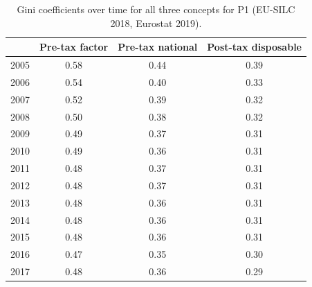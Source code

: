 \documentclass[a4paper]{article}\usepackage[]{graphicx}\usepackage[]{color}
\begin{document}
\begin{table}[ht]
\centering
\begin{tabular}{lccc}
  \toprule
 & Pre-tax factor & Pre-tax national & Post-tax disposable \\ 
  \midrule
2005 & 0.58 & 0.44 & 0.39 \\ 
  2006 & 0.54 & 0.40 & 0.33 \\ 
  2007 & 0.52 & 0.39 & 0.32 \\ 
  2008 & 0.50 & 0.38 & 0.32 \\ 
  2009 & 0.49 & 0.37 & 0.31 \\ 
  2010 & 0.49 & 0.36 & 0.31 \\ 
  2011 & 0.48 & 0.37 & 0.31 \\ 
  2012 & 0.48 & 0.37 & 0.31 \\ 
  2013 & 0.48 & 0.36 & 0.31 \\ 
  2014 & 0.48 & 0.36 & 0.31 \\ 
  2015 & 0.48 & 0.36 & 0.31 \\ 
  2016 & 0.47 & 0.35 & 0.30 \\ 
  2017 & 0.48 & 0.36 & 0.29 \\ 
   \bottomrule
\end{tabular}
\caption{Gini coefficients over time for all three concepts for P1 (EU-SILC 2018, Eurostat 2019).} 
\label{gini_p1}
\end{table}
\end{document}
